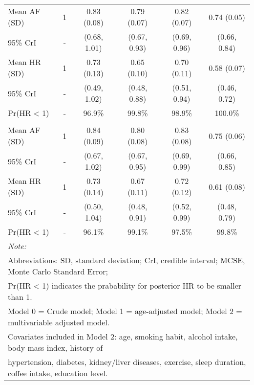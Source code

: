 \documentclass[nutrients,article,submitted,moreauthors,pdftex]{mdpi}
\begin{document}
\begin{table}[H]
{\begin{tabular}[t]{lccccc}
\rowcolor{gray!6}  \hspace{1em}Mean AF (SD) & 1 & 0.83 (0.08) & 0.79 (0.07) & 0.82 (0.07) & 0.74 (0.05)\\
\hspace{1em}95\% CrI & - & (0.68, 1.01) & (0.67, 0.93) & (0.69, 0.96) & (0.66, 0.84)\\
\rowcolor{gray!6}  \hspace{1em}Mean HR (SD) & 1 & 0.73 (0.13) & 0.65 (0.10) & 0.70 (0.11) & 0.58 (0.07)\\
\hspace{1em}95\% CrI & - & (0.49, 1.02) & (0.48, 0.88) & (0.51, 0.94) & (0.46, 0.72)\\
\rowcolor{gray!6}  \hspace{1em}Pr(HR < 1) & - & 96.9\% & 99.8\% & 98.9\% & 100.0\%\\
\addlinespace[0.3em]
\multicolumn{6}{l}{\textbf{Model 2}}\\
\hspace{1em}Mean AF (SD) & 1 & 0.84 (0.09) & 0.80 (0.08) & 0.83 (0.08) & 0.75 (0.06)\\
\rowcolor{gray!6}  \hspace{1em}95\% CrI & - & (0.67, 1.02) & (0.67, 0.95) & (0.69, 0.99) & (0.66, 0.85)\\
\hspace{1em}Mean HR (SD) & 1 & 0.73 (0.14) & 0.67 (0.11) & 0.72 (0.12) & 0.61 (0.08)\\
\rowcolor{gray!6}  \hspace{1em}95\% CrI & - & (0.50, 1.04) & (0.48, 0.91) & (0.52, 0.99) & (0.48, 0.79)\\
\hspace{1em}Pr(HR < 1) & - & 96.1\% & 99.1\% & 97.5\% & 99.8\%\\
\bottomrule
\multicolumn{6}{l}{\textit{Note: }}\\
\multicolumn{6}{l}{Abbreviations: SD, standard deviation; CrI, credible interval; MCSE, Monte Carlo Standard Error;}\\
\multicolumn{6}{l}{ Pr(HR < 1) indicates the prabability for posterior HR to be smaller than 1.}\\
\multicolumn{6}{l}{Model 0 = Crude model; Model 1 = age-adjusted model; Model 2 = multivariable adjusted model.}\\
\multicolumn{6}{l}{Covariates included in Model 2: age, smoking habit, alcohol intake, body mass index, history of}\\
\multicolumn{6}{l}{hypertension, diabetes, kidney/liver diseases, exercise, sleep duration, coffee intake, education level.}\\
\end{tabular}}
\end{table}
\end{document}
